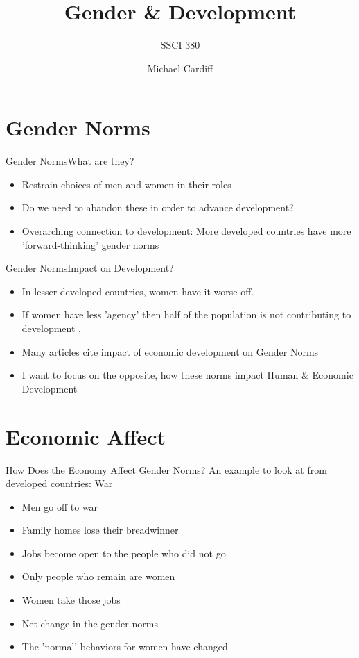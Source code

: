 \documentclass{beamer}
\title{Gender \& Development}
\author{Michael Cardiff}
\subtitle{SSCI 380}
\begin{document}
\begin{frame}
  \titlepage
\end{frame}


\section{Gender Norms}
\begin{frame}{Gender Norms}{What are they?}
  \begin{itemize}
    \item Restrain choices of men and women in their roles
    \item Do we need to abandon these in order to advance development?
  \item Overarching connection to development: More developed countries have more 'forward-thinking' gender norms
  \end{itemize}
\end{frame}

\begin{frame}{Gender Norms}{Impact on Development?}
  \begin{itemize}
  \item In lesser developed countries, women have it worse off.
  \item If women have less 'agency' then half of the population is not contributing to development \cite{bhatt}.
  \item Many articles cite impact of economic development on Gender Norms \cite{elson,ferrant,foho}
  \item I want to focus on the opposite, how these norms impact Human \& Economic Development
  \end{itemize}
\end{frame}

\section{Economic Affect}
\begin{frame}{How Does the Economy Affect Gender Norms?}
  An example to look at from developed countries: War \cite{elson}
  \begin{itemize}
  \item Men go off to war
  \item Family homes lose their breadwinner
  \item Jobs become open to the people who did not go
  \item Only people who remain are women
  \item Women take those jobs
  \item Net change in the gender norms
  \item The 'normal' behaviors for women have changed
  \end{itemize}
\end{frame}
\end{document}
